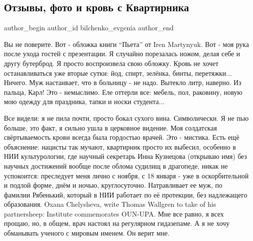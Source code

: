  
 
 
 
 
 
\subsection{Отзывы, фото и кровь с Квартирника}
\label{sec:13_06_2021.fb.bilchenko_evgenia.2.krovj_kvartirnik_otzyvy_foto}
\ifcmt
 author_begin
   author_id bilchenko_evgenia
 author_end
\fi

Вы не поверите. Вот - обложка книги \enquote{Пьета} от Iren Martynyuk. Вот -
моя рука после ухода гостей с презентации. Я случайно порезалась ножом, делая
себе и другу бутерброд. Я просто воспроизвела свою  обложку. Кровь не хочет
останавливаться уже вторые сутки: йод, спирт, зелёнка, бинты, перетяжки...
Ничего. Муж настаивает, что в больницу - не надо. Вытекло литр, наверно. Из
пальца, Карл! Это - немыслимо. Еле оттерли все: мебель, пол, раковину, новую
мою одежду для праздника, тапки и носки студента... 

Все видели: я не пила почти, просто бокал сухого вина. Символически. Я не пью
больше, это факт, я сильно ушла в церковное видение. Моя солдатская
свёртываемость крови всегда была гордостью врачей. Это - мистика. Есть ещё
объяснение: нацисты так мучают, квартирник просто их выбесил, особенно в НИИ
культурологии, где научный секретарь Инна Кузнецова (открываю имя) без научных
достижений вообще после облома судилищ в драгопеде, никак не успокоится:
преследует меня лично с ноября, с 18 января - уже в оскорбительной и подлой
форме, днём и ночью, круглосуточно. Натравливает ее муж, по фамилии Рябенький,
который в НИИ работает по её протекции, без надлежащего образования. Oxana
Chelysheva, write Thomas Wallgren to take of his partnersheep: Institute
commemorates OUN-UPA. Мне все равно, я всех прощаю, но, в общем, врач настоял
на регулярном гидазепаме. А я не хочу обманывать ученого с мировым именем. Он
верит мне. 


